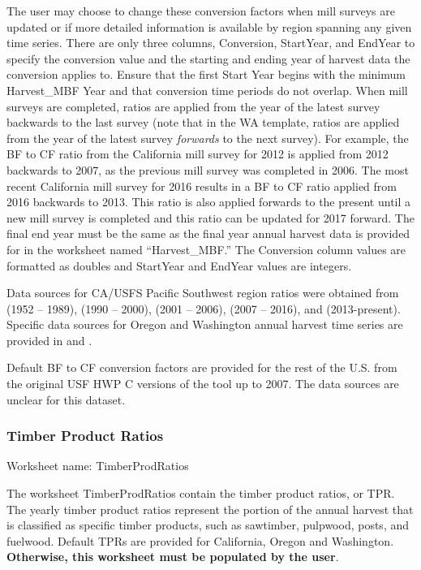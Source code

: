 \documentclass[
  openany]{book}
\begin{document}
The user may choose to change these conversion factors when mill surveys are updated or if more detailed information is available by region spanning any given time series. There are only three columns, Conversion, StartYear, and EndYear to specify the conversion value and the starting and ending year of harvest data the conversion applies to. Ensure that the first Start Year begins with the minimum Harvest\_MBF Year and that conversion time periods do not overlap. When mill surveys are completed, ratios are applied from the year of the latest survey backwards to the last survey (note that in the WA template, ratios are applied from the year of the latest survey \emph{forwards} to the next survey). For example, the BF to CF ratio from the California mill survey for 2012 is applied from 2012 backwards to 2007, as the previous mill survey was completed in 2006. The most recent California mill survey for 2016 results in a BF to CF ratio applied from 2016 backwards to 2013. This ratio is also applied forwards to the present until a new mill survey is completed and this ratio can be updated for 2017 forward. The final end year must be the same as the final year annual harvest data is provided for in the worksheet named ``Harvest\_MBF.'' The Conversion column values are formatted as doubles and StartYear and EndYear values are integers.

Data sources for CA/USFS Pacific Southwest region ratios were obtained from \textcite{keegan2010} (1952 -- 1989), \textcite{morgan2004} (1990 -- 2000), \textcite{morgan2012} (2001 -- 2006), \textcite{mciver2015} (2007 -- 2016), and \textcite{marcille2020} (2013-present). Specific data sources for Oregon and Washington annual harvest time series are provided in \textcite{morgan2021} and \textcite{nichols2020}.

Default BF to CF conversion factors are provided for the rest of the U.S. from the original USF HWP C versions of the tool up to 2007. The data sources are unclear for this dataset.

\hypertarget{own-prov-input-tpr}{%
\subsubsection{Timber Product Ratios}\label{own-prov-input-tpr}}

Worksheet name: TimberProdRatios

The worksheet TimberProdRatios contain the timber product ratios, or TPR. The yearly timber product ratios represent the portion of the annual harvest that is classified as specific timber products, such as sawtimber, pulpwood, posts, and fuelwood. Default TPRs are provided for California, Oregon and Washington. \textbf{Otherwise, this worksheet must be populated by the user}.
\end{document}
